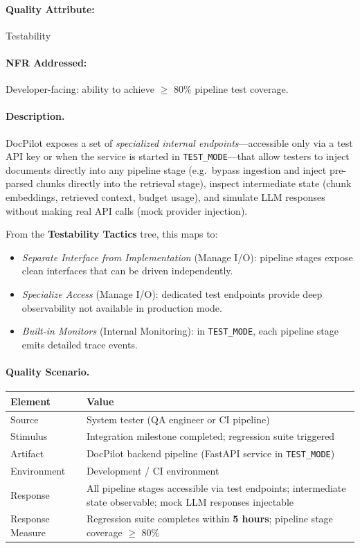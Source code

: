 \documentclass[12pt,a4paper]{article}
\begin{document}
\paragraph{Quality Attribute:} Testability

\paragraph{NFR Addressed:} Developer-facing: ability to achieve $\geq$ 80\% pipeline test coverage.

\paragraph{Description.}
DocPilot exposes a set of \textit{specialized internal endpoints}---accessible only via a test
API key or when the service is started in \texttt{TEST\_MODE}---that allow testers to inject
documents directly into any pipeline stage (e.g.\ bypass ingestion and inject pre-parsed chunks
directly into the retrieval stage), inspect intermediate state (chunk embeddings, retrieved
context, budget usage), and simulate LLM responses without making real API calls (mock provider
injection).

From the \textbf{Testability Tactics} tree, this maps to:
\begin{itemize}[nosep]
    \item \textit{Separate Interface from Implementation} (Manage I/O): pipeline stages expose
          clean interfaces that can be driven independently.
    \item \textit{Specialize Access} (Manage I/O): dedicated test endpoints provide deep
          observability not available in production mode.
    \item \textit{Built-in Monitors} (Internal Monitoring): in \texttt{TEST\_MODE}, each pipeline
          stage emits detailed trace events.
\end{itemize}

\paragraph{Quality Scenario.}

\begin{center}
\begin{tabular}{@{}L{3.5cm}L{9cm}@{}}
\toprule
\textbf{Element} & \textbf{Value} \\
\midrule
Source & System tester (QA engineer or CI pipeline) \\
Stimulus & Integration milestone completed; regression suite triggered \\
Artifact & DocPilot backend pipeline (FastAPI service in \texttt{TEST\_MODE}) \\
Environment & Development / CI environment \\
Response & All pipeline stages accessible via test endpoints; intermediate state observable; mock LLM responses injectable \\
Response Measure & Regression suite completes within \textbf{5 hours}; pipeline stage coverage $\geq$ 80\% \\
\bottomrule
\end{tabular}
\end{center}
\end{document}
